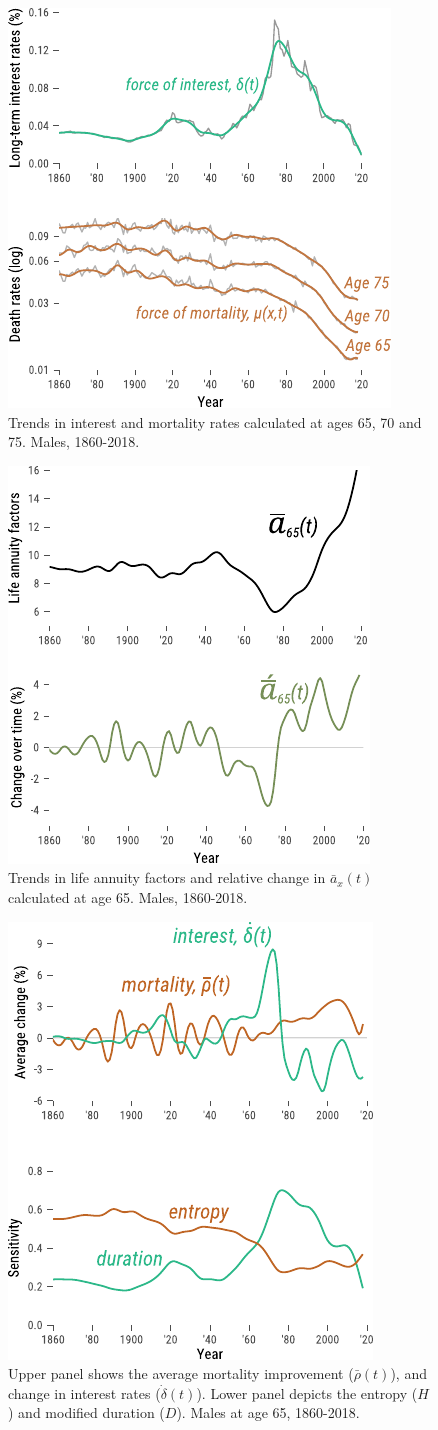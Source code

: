 \documentclass[12pt]{article}
\begin{document}
\begin{figure}[!ht]
	\centering
	\includegraphics[width=0.5\linewidth]{Fig/deltamu}
	\caption{{Trends in interest and mortality rates calculated at ages 65, 70 and 75. Males, 1860-2018.}}
	\label{fig:Fig1}
\end{figure}


 \begin{figure}[!ht]
	\centering
	\includegraphics[width=0.5\linewidth]{Fig/axm}
	\caption{{Trends in life annuity factors and relative change in $\bar{a}_x(t)$ calculated at age 65. Males, 1860-2018.}}
	\label{fig:Fig2}
\end{figure}

\begin{figure}[!ht]
	\centering
	\includegraphics[width=0.5\linewidth]{Fig/IntMort}
	\caption{{Upper panel shows the average mortality improvement ($\bar{\rho}(t)$), and change in interest rates ($\dot{\delta}(t)$). Lower panel depicts the entropy ($H$) and modified duration ($D$). Males at age 65, 1860-2018.}}
	\label{fig:Fig3}
\end{figure}
\end{document}
